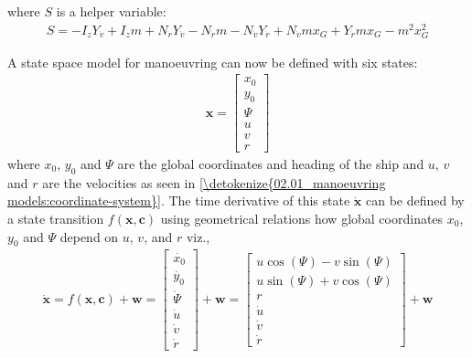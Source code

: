 where \(S\) is a helper variable:
\begin{equation}\label{equation:02.01_manoeuvring models:eq_S}
\begin{split}\displaystyle S = - I_{z} Y_{\dot{v}} + I_{z} m + N_{\dot{r}} Y_{\dot{v}} - N_{\dot{r}} m - N_{\dot{v}} Y_{\dot{r}} + N_{\dot{v}} m x_{G} + Y_{\dot{r}} m x_{G} - m^{2} x_{G}^{2}\end{split}
\end{equation}


\noindent A state space model for manoeuvring can now be defined with six states:
\begin{equation}\label{equation:02.01_manoeuvring models:eq_x}
\begin{split}\displaystyle \mathbf{x} = \left[\begin{matrix}x_{0}\\y_{0}\\\Psi\\u\\v\\r\end{matrix}\right]\end{split}
\end{equation}
\noindent where $x_0$, $y_0$ and $\Psi$ are the global coordinates and heading of the ship and $u$, $v$ and $r$ are the velocities as seen in \autoref{\detokenize{02.01_manoeuvring models:coordinate-system}}.
The time derivative of this state \(\dot{\mathbf{x}}\) can be defined by a state transition \(f(\mathbf{x},\mathbf{c})\) using geometrical relations
how global coordinates \(x_0\), \(y_0\) and \(\Psi\) depend on \(u\), \(v\), and \(r\) viz.,
\begin{equation}\label{equation:02.01_manoeuvring models:eqf}
\begin{split}\displaystyle \dot{\mathbf{x}} = f(\mathbf{x},\mathbf{c}) + \mathbf{w}
                                          = \left[\begin{matrix}\dot{x_0}\\ \dot{y_0} \\ \dot{\Psi} \\\dot{u}\\\dot{v}\\\dot{r}\end{matrix}\right] + \mathbf{w}
                                          = \left[\begin{matrix}u \cos{\left(\Psi \right)} - v \sin{\left(\Psi \right)}\\u \sin{\left(\Psi \right)} + v \cos{\left(\Psi \right)}\\r\\\dot{u}\\\dot{v}\\\dot{r}\end{matrix}\right] + \mathbf{w}\end{split}
\end{equation}

